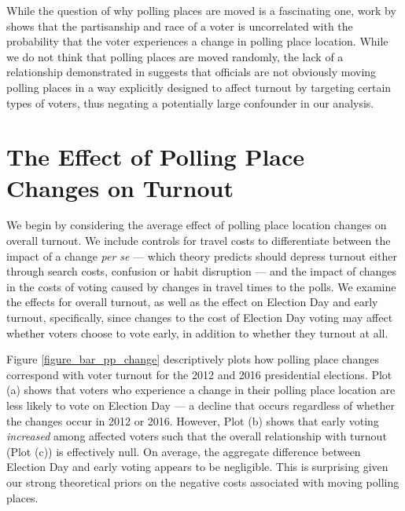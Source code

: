 \documentclass{cup_PSRM}
\begin{document}
While the question of why polling places are moved is a fascinating one, work by \cite{clintontargering2018} shows that the partisanship and race of a voter is uncorrelated with the probability that the voter experiences a change in polling place location. While we do not think that polling places are moved randomly, the lack of a relationship demonstrated in  \cite{clintontargering2018} suggests that officials are not obviously moving polling places in a way explicitly designed to affect turnout by targeting certain types of voters,  thus negating a potentially large confounder in our analysis.




\section{The Effect of Polling Place Changes on Turnout}\label{section_empirical_main}

\noindent We begin by considering the average effect of polling place location changes on overall turnout.  We include controls for travel costs to differentiate between the impact of a change \emph{per se} --- which theory predicts should depress turnout either through search costs, confusion or habit disruption --- and the impact of changes in the costs of voting caused by changes in travel times to the polls. We examine the effects for overall turnout, as well as the effect on Election Day and early turnout, specifically, since changes to the cost of Election Day voting may affect whether voters choose to vote early, in addition to whether they turnout at all.

Figure \ref{figure_bar_pp_change} descriptively plots how polling place changes correspond with voter turnout for the 2012 and 2016 presidential elections.  Plot (a) shows that voters who experience a change in their polling place location are less likely to vote on Election Day --- a decline that occurs regardless of whether the changes occur in 2012 or 2016.  However, Plot (b) shows that early voting \emph{increased} among affected voters such that the overall relationship with turnout (Plot (c)) is effectively null.  On average, the aggregate difference between Election Day and early voting appears to be negligible.  This is surprising given our strong theoretical priors on the negative costs associated with moving polling places.
\end{document}
